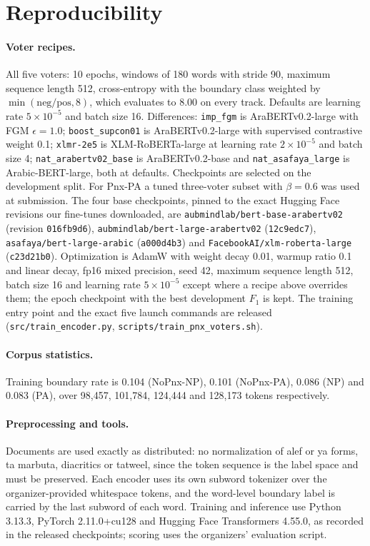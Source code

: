 \documentclass[11pt]{article}
\begin{document}
\section{Reproducibility}
\label{sec:appendix}
\paragraph{Voter recipes.} All five voters: 10 epochs, windows of 180 words with stride 90,
maximum sequence length 512, cross-entropy with the boundary class weighted by
$\min(\mathrm{neg}/\mathrm{pos}, 8)$, which evaluates to 8.00 on every track. Defaults are
learning rate $5{\times}10^{-5}$ and batch size 16. Differences: \texttt{imp\_fgm} is
AraBERTv0.2-large with FGM $\epsilon = 1.0$; \texttt{boost\_supcon01} is AraBERTv0.2-large
with supervised contrastive weight 0.1; \texttt{xlmr-2e5} is XLM-RoBERTa-large at learning
rate $2{\times}10^{-5}$ and batch size 4; \texttt{nat\_arabertv02\_base} is
AraBERTv0.2-base and \texttt{nat\_asafaya\_large} is Arabic-BERT-large, both at defaults.
Checkpoints are selected on the development split. For Pnx-PA a tuned three-voter subset
with $\beta = 0.6$ was used at submission.
The four base checkpoints, pinned to the exact Hugging Face revisions our fine-tunes
downloaded, are \texttt{aubmindlab/bert-base-arabertv02} (revision \texttt{016fb9d6}),
\texttt{aubmindlab/bert-large-arabertv02} (\texttt{12c9edc7}),
\texttt{asafaya/bert-large-arabic} (\texttt{a000d4b3}) and
\texttt{FacebookAI/xlm-roberta-large} (\texttt{c23d21b0}). Optimization is AdamW with
weight decay 0.01, warmup ratio 0.1 and linear decay, fp16 mixed precision, seed 42,
maximum sequence length 512, batch size 16 and learning rate $5{\times}10^{-5}$ except
where a recipe above overrides them; the epoch checkpoint with the best development
$F_1$ is kept. The training entry point and the exact five launch commands are released
(\texttt{src/train\_encoder.py}, \texttt{scripts/train\_pnx\_voters.sh}).

\paragraph{Corpus statistics.} Training boundary rate is 0.104 (NoPnx-NP), 0.101
(NoPnx-PA), 0.086 (NP) and 0.083 (PA), over 98{,}457, 101{,}784, 124{,}444 and 128{,}173
tokens respectively.
\paragraph{Preprocessing and tools.}
Documents are used exactly as distributed: no normalization of alef or ya forms, ta
marbuta, diacritics or tatweel, since the token sequence is the label space and must be
preserved. Each encoder uses its own subword tokenizer over the organizer-provided
whitespace tokens, and the word-level boundary label is carried by the last subword of
each word. Training and inference use Python 3.13.3, PyTorch 2.11.0+cu128 and Hugging Face
Transformers 4.55.0, as recorded in the released checkpoints; scoring uses the
organizers' evaluation script.
\end{document}
